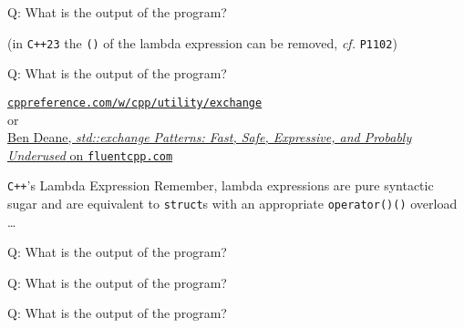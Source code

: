 \begin{frame}[fragile]{Q: What is the output of the program?}

    \vspace{5mm}

    \begin{center}
        ({\footnotesize in \texttt{C++23} the \texttt{()} of the lambda expression can be removed, \textit{cf.} \texttt{P1102}})
    \end{center}
\end{frame}


\begin{frame}[fragile]{Q: What is the output of the program?}

    \footnotesize
    \begin{center}
    \href{https://en.cppreference.com/w/cpp/utility/exchange}{\texttt{cppreference.com/w/cpp/utility/exchange}} \\
    or \\
    \href{https://www.fluentcpp.com/2020/09/25/stdexchange-patterns-fast-safe-expressive-and-probably-underused/}{Ben Deane, \textit{std::exchange Patterns: Fast, Safe, Expressive, and Probably Underused} on \texttt{fluentcpp.com}}
    \end{center}
\end{frame}


\begin{frame}{\texttt{C++}'s Lambda Expression}
    Remember, lambda expressions are pure syntactic sugar and are equivalent to \texttt{struct}s with an appropriate \texttt{operator()()} overload \ldots
\end{frame}

\begin{frame}[fragile]{Q: What is the output of the program?}
\end{frame}


\begin{frame}[fragile]{Q: What is the output of the program?}
\end{frame}


\begin{frame}[fragile]{Q: What is the output of the program?}

\end{frame}

\begin{frame}
    \centering
    \scalebox{3}{Stateful Lambdas}
\end{frame}

